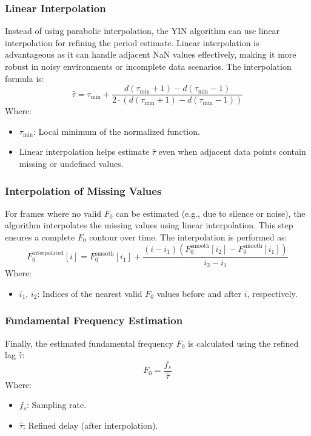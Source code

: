\documentclass{ieeeaccess}
\begin{document}
\subsubsection{Linear Interpolation}
Instead of using parabolic interpolation, the YIN algorithm can use linear interpolation for refining the period estimate. Linear interpolation is advantageous as it can handle adjacent NaN values effectively, making it more robust in noisy environments or incomplete data scenarios.
The interpolation formula is:
\begin{equation}
\hat{\tau} = \tau_{\text{min}} + \frac{d(\tau_{\text{min}} + 1) - d(\tau_{\text{min}} - 1)}{2 \cdot \left( d(\tau_{\text{min}} + 1) - d(\tau_{\text{min}} - 1) \right)}
\end{equation}
Where:
\begin{itemize}
    \item \( \tau_{\text{min}} \): Local minimum of the normalized function.
    \item Linear interpolation helps estimate \( \hat{\tau} \) even when adjacent data points contain missing or undefined values.
\end{itemize}

\subsubsection{Interpolation of Missing Values}
For frames where no valid \( F_0 \) can be estimated (e.g., due to silence or noise), the algorithm interpolates the missing values using linear interpolation. This step ensures a complete \( F_0 \) contour over time.
The interpolation is performed as:
\begin{equation}
F_0^{\text{interpolated}}[i] = F_0^{\text{smooth}}[i_1] + \frac{(i - i_1)(F_0^{\text{smooth}}[i_2] - F_0^{\text{smooth}}[i_1])}{i_2 - i_1}
\end{equation}
Where:
\begin{itemize}
    \item \( i_1 \), \( i_2 \): Indices of the nearest valid \( F_0 \) values before and after \( i \), respectively.
\end{itemize}

\subsubsection{Fundamental Frequency Estimation}
Finally, the estimated fundamental frequency \( F_0 \) is calculated using the refined lag \( \hat{\tau} \):
\begin{equation}
F_0 = \frac{f_s}{\hat{\tau}}
\end{equation}
Where:
\begin{itemize}
    \item \( f_s \): Sampling rate.
    \item \( \hat{\tau} \): Refined delay (after interpolation).
\end{itemize}
\end{document}
